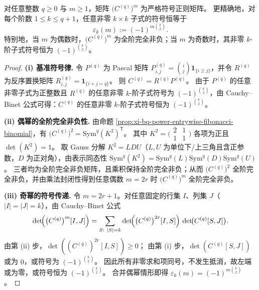 \begin{theorem}\label{thm:xi-Cq-power-strict-sign-regular}
对任意整数 \(q\ge 0\) 与 \(m\ge 1\)，矩阵 \(\bigl(C^{(q)}\bigr)^m\) 为严格符号正则矩阵。
更精确地，对每个阶数 \(1\le k\le q+1\)，任意非零 \(k\times k\) 子式的符号恒等于
\[
\varepsilon_k(m):=(-1)^{m\binom{k}{2}}.
\]
特别地，当 \(m\) 为偶数时，\(\bigl(C^{(q)}\bigr)^m\) 为全阶完全非负；当 \(m\) 为奇数时，其非零 \(k\)-阶子式符号恒为 \((-1)^{\binom{k}{2}}\)。
\end{theorem}
\begin{proof}
\par\noindent\textbf{(i) 基准符号律.}
令 \(P^{(q)}\) 为 Pascal 矩阵 \(P^{(q)}_{i,j}=\binom{i}{j}\mathbf 1_{\{i\ge j\}}\)，并令 \(R^{(q)}\) 为反序置换矩阵 \(R^{(q)}_{i,j}=\mathbf 1_{\{i+j=q\}}\)。
则 \(C^{(q)}=R^{(q)}P^{(q)}\)。
由于 \(P^{(q)}\) 的任意非零子式为正整数且 \(R^{(q)}\) 的任意非零 \(k\)-阶子式符号为 \((-1)^{\binom{k}{2}}\)，由 Cauchy--Binet 公式可得：\(C^{(q)}\) 的任意非零 \(k\)-阶子式符号恒为 \((-1)^{\binom{k}{2}}\)。
\par
\noindent\textbf{(ii) 偶幂的全阶完全非负性.}
由命题 \ref{prop:xi-bq-power-entrywise-fibonacci-binomial}，有 \(\bigl(C^{(q)}\bigr)^2=\mathrm{Sym}^q(K^2)^{\mathsf T}\)。
其中 \(K^2=\bigl(\begin{smallmatrix}2&1\\ 1&1\end{smallmatrix}\bigr)\) 各项为正且 \(\det(K^2)=1\)。
取 Gauss 分解 \(K^2=LDU\)（\(L,U\) 为单位下/上三角且含正参数，\(D\) 为正对角），由表示同态性
\(
\mathrm{Sym}^q(K^2)=\mathrm{Sym}^q(L)\mathrm{Sym}^q(D)\mathrm{Sym}^q(U)
\)。
三者均为全阶完全非负矩阵，且乘积保持全阶完全非负；从而 \(\bigl(C^{(q)}\bigr)^2\) 全阶完全非负，并由乘法封闭性得到任意偶数 \(m=2r\) 时 \(\bigl(C^{(q)}\bigr)^m\) 全阶完全非负。
\par
\noindent\textbf{(iii) 奇幂的符号传递.}
令 \(m=2r+1\)。对任意固定的行集 \(I\)、列集 \(J\)（\(|I|=|J|=k\)），由 Cauchy--Binet 公式
\[
\det\!\Bigl(\bigl(C^{(q)}\bigr)^{m}[I,J]\Bigr)
=\sum_{S:\ |S|=k}\det\!\Bigl(\bigl(C^{(q)}\bigr)^{2r}[I,S]\Bigr)\,\det\!\bigl(C^{(q)}[S,J]\bigr).
\]
由第 (ii) 步，\(\det((C^{(q)})^{2r}[I,S])\ge 0\)；
由第 (i) 步，\(\det(C^{(q)}[S,J])\) 或为 \(0\)，或符号为 \((-1)^{\binom{k}{2}}\)。
因此所有非零求和项同号，不发生抵消，故左端或为零，或符号恒为 \((-1)^{\binom{k}{2}}\)。
合并偶幂情形即得 \(\varepsilon_k(m)=(-1)^{m\binom{k}{2}}\)。
\end{proof}

\endinput
